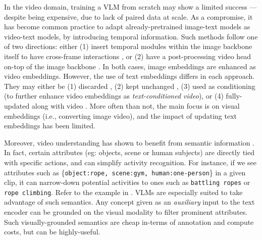 \documentclass[10pt,twocolumn,letterpaper]{article}
\begin{document}
In the video domain, training a VLM from scratch may show a limited success \cite{xu2021videoclip}--- despite being expensive, due to lack of paired data at scale. As a compromise, it has become common practice to adapt already-pretrained image-text models as video-text models, by introducing temporal information. Such methods follow one of two directions: either (1) insert temporal modules within the image backbone itself to have cross-frame interactions \cite{ma2022xclip}, or (2) have a post-processing video head on-top of the image backbone \cite{luo2022clip4clip, wang2021actionclip, bain2022cliphitchhiker, lin2022evl}. In both cases, image embeddings are enhanced as video embeddings. However, the use of text embeddings differs in each approach. They may either be (1) discarded \cite{lin2022evl}, (2) kept unchanged \cite{luo2022clip4clip, wang2021actionclip}, (3) used as conditioning \cite{bain2022cliphitchhiker} (to further enhance video embeddings as \textit{text-conditioned video}), or (4) fully-updated along with video \cite{ma2022xclip}. More often than not, the main focus is on visual embeddings (i.e., converting image  video), and the impact of updating text embeddings has been limited.

Moreover, video understanding has shown to benefit from semantic information \cite{ji2020action, zeng2022socratic, wang2022language}. In fact, certain attributes (eg: objects, scene or human subjects) are directly tied with specific actions, and can simplify activity recognition. For instance, if we see attributes such as \{\texttt{object:rope, scene:gym, human:one-person}\} in a given clip, it can narrow-down potential activities to ones such as \texttt{battling ropes} or \texttt{rope climbing}. Refer to the example in . VLMs are especially suited to take advantage of such semantics. Any concept given as an \textit{auxiliary} input to the text encoder can be grounded on the visual modality to filter prominent attributes. Such visually-grounded semantics are cheap in-terms of annotation and compute costs, but can be highly-useful.
\end{document}
